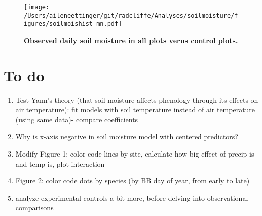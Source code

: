 \documentclass{article}
\begin{document}
\begin{figure}[h]
\centering
 \texttt{[image: /Users/aileneettinger/git/radcliffe/Analyses/soilmoisture/figures/soilmoishist\_mn.pdf]}
 \caption{\textbf{Observed daily soil moisture in all plots verus control plots.}} 
 \label{fig:sm}
 \end{figure}


\section* {To do}
\begin{enumerate}
\item Test Yann's theory (that soil moisture affects phenology through its effects on air temperature): fit models with soil temperature instead of air temperature (using same data)- compare coefficients
\item Why is x-axis negative in soil moisture model with centered predictors?
\item Modify Figure 1: color code lines by site, calculate how big effect of precip is and temp is, plot interaction
\item Figure 2: color code dots by species (by BB day of year, from early to late)
\item analyze experimental controls a bit more, before delving into observational comparisons
\end{enumerate}


\end{document}
